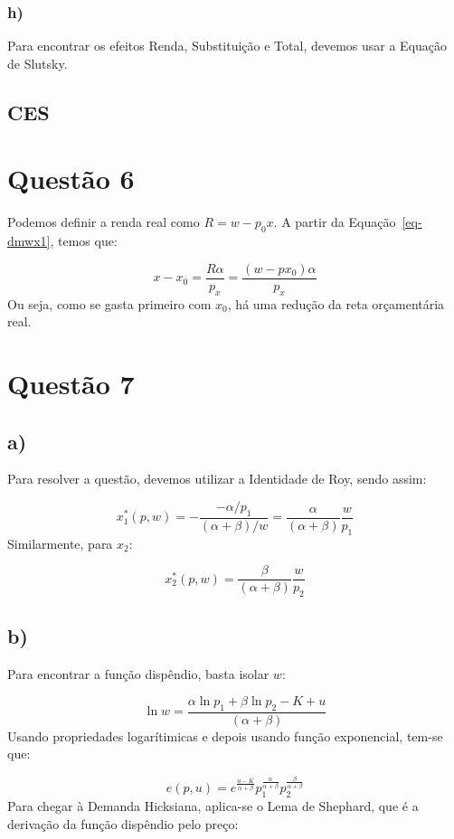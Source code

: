 \documentclass[
  letterpaper,
  DIV=11,
  numbers=noendperiod]{scrartcl}
\begin{document}
\subsubsection{h)}\label{h}

Para encontrar os efeitos Renda, Substituição e Total, devemos usar a
Equação de Slutsky.

\subsection{CES}\label{ces}

\section{Questão 6}\label{questuxe3o-6}

Podemos definir a renda real como \(R = w - p_0x\). A partir da
Equação~\ref{eq-dmwx1}, temos que:

\[
x-x_0 = \frac{R\alpha}{p_x} =\frac{( w - px_0)\alpha}{p_x}
\] Ou seja, como se gasta primeiro com \(x_0\), há uma redução da reta
orçamentária real.

\section{Questão 7}\label{questuxe3o-7}

\subsection{a)}\label{a-3}

Para resolver a questão, devemos utilizar a Identidade de Roy, sendo
assim:

\[
x_1^*(p,w) = -\frac{-\alpha/p_1}{(\alpha + \beta)/w} = \frac{\alpha}{(\alpha+\beta)}\frac{w}{p_1}
\] Similarmente, para \(x_2\):

\[
x_2^*(p,w) =  \frac{\beta}{(\alpha+\beta)}\frac{w}{p_2}
\]

\subsection{b)}\label{b-3}

Para encontrar a função dispêndio, basta isolar \(w\):

\[
\ln w = \frac{\alpha\ln p_1 + \beta\ln p_2 -K+u}{(\alpha + \beta)}
\] Usando propriedades logarítimicas e depois usando função exponencial,
tem-se que:

\[
e(p, u) = e^{\frac{u - K}{\alpha + \beta}} p_1^{\frac{\alpha}{\alpha + \beta}} p_2^{\frac{\beta}{\alpha + \beta}}
\] Para chegar à Demanda Hicksiana, aplica-se o Lema de Shephard, que é
a derivação da função dispêndio pelo preço:
\end{document}
